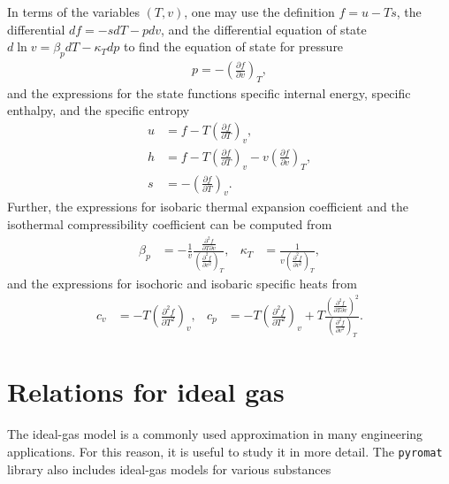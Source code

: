 In terms of the variables $(T,v)$, one may use the definition $f=u-Ts$, the differential $df=-sdT-pdv$, and the differential equation of state $d\ln v=\beta_pdT-\kappa_Tdp$ to find the equation of state for pressure
\begin{align}
    p=-\left(\frac{\partial f}{\partial v}\right)_T,
\end{align}
and the expressions for the state functions specific internal energy, specific enthalpy, and the specific entropy
\begin{align}
    u&=f-T\left(\frac{\partial f}{\partial T}\right)_v,\\
    h&=f-T\left(\frac{\partial f}{\partial T}\right)_v-v\left(\frac{\partial f}{\partial v}\right)_T,\\
    s&=-\left(\frac{\partial f}{\partial T}\right)_v.
\end{align}
Further, the expressions for isobaric thermal expansion coefficient and the isothermal compressibility coefficient can be computed from
\begin{align}
    \beta_p&=-\frac{1}{v}\frac{\frac{\partial^2f}{\partial T\partial v}}{\left(\frac{\partial^2f}{\partial v^2}\right)_T}, &
    \kappa_T&=\frac{1}{v\left(\frac{\partial^2f}{\partial v^2}\right)_T},
\end{align}
and the expressions for isochoric and isobaric specific heats from
\begin{align}
    c_v&=-T\left(\frac{\partial^2f}{\partial T^2}\right)_v, &
    c_p&=-T\left(\frac{\partial^2f}{\partial T^2}\right)_v+T\frac{\left(\frac{\partial^2f}{\partial T\partial v}\right)^2}{\left(\frac{\partial^2f}{\partial v^2}\right)_T}.
\end{align}


\section{Relations for ideal gas}
The ideal-gas model is a commonly used approximation in many engineering applications. For this reason, it is useful to study it in more detail. The \verb|pyromat| library also includes ideal-gas models for various substances

